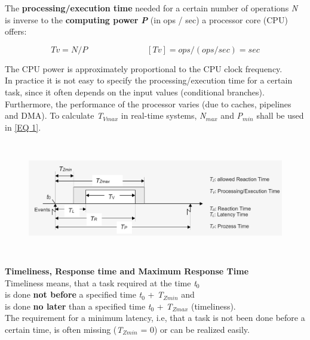 The \textbf{processing/execution time }needed for a certain number of operations \textit{N} is inverse to the \textbf{computing power} \textbf{\textit{P}} (in ops / sec) a processor core (CPU) offers:

\begin{equation}
	Tv = N / P \hspace{3cm} [Tv] = ops / (ops / sec) = sec
\label{EQ 1}
\end{equation}

The CPU power is approximately proportional to the CPU clock frequency.\\

In practice it is not easy to specify the processing/execution time for a certain task, since it often depends on the input values (conditional branches). Furthermore, the performance of the processor varies (due to caches, pipelines and DMA). To calculate \textit{T${}_{Vmax}$} in real-time systems, \textit{N${}_{max}$} and \textit{P${}_{min}$} shall be used in \ref{EQ 1}.

	\begin{figure}[h]
    \centering
    \includegraphics[width=15cm, height=5cm]{Images/image75.png}
    \label{fig:Fig }
    \end{figure}

\textbf{Timeliness, Response time and Maximum Response Time}\\

Timeliness means, that a task required at the time \textit{t}${}_{0}$\\
\hspace{3cm} is done \textbf{not before} a specified time \textit{t}${}_{0}$ + \textit{T${}_{Zmin}$} and\\
\hspace{3cm} is done \textbf{no later} than a specified time \textit{t}${}_{0}$ + \textit{T${}_{Zmax}$} (timeliness).\\

The requirement for a minimum latency, i.e, that a task is not been done before a certain time, is often missing (\textit{T${}_{Zmin}$} = 0) or can be realized easily.\\ 

